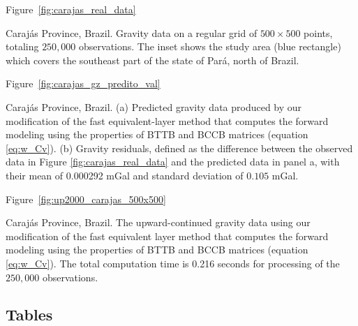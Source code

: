 \documentclass[manuscript,revised]{geophysics}
\begin{document}
Figure~\ref{fig:carajas_real_data}

{Caraj\'as Province, Brazil. Gravity data on a regular grid of $500 \times 500$ points, totaling $250,000$ observations. The inset shows the study area (blue rectangle) which covers the southeast part of the state of Par\'a, north of Brazil.}
\newpage

Figure~\ref{fig:carajas_gz_predito_val}

{Caraj\'as Province, Brazil. (a) Predicted gravity data produced by our modification of the fast equivalent-layer method \citep{siqueira-etal2017}  that computes the forward modeling using the properties of BTTB and BCCB matrices (equation \ref{eq:w_Cv}). (b) Gravity residuals, defined as the difference between the observed data in Figure \ref{fig:carajas_real_data} and the predicted data in panel a, with their mean of 0.000292 mGal and standard deviation of $0.105$ mGal.}
\newpage

Figure~\ref{fig:up2000_carajas_500x500}

{Caraj\'as Province, Brazil. The upward-continued gravity data using our modification of the fast equivalent layer method \citep{siqueira-etal2017} that computes the forward modeling using the properties of BTTB and BCCB matrices (equation \ref{eq:w_Cv}). The total computation time is 0.216 seconds for processing of the $250,000$ observations.}
\newpage

%
%

\subsection{Tables}
\end{document}
